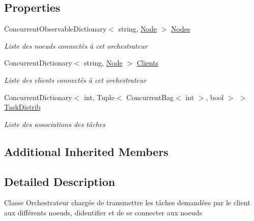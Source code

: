 \subsection*{Properties}
\begin{DoxyCompactItemize}
\item 
Concurrent\+Observable\+Dictionary$<$ string, \hyperlink{class_node_net_1_1_network_1_1_nodes_1_1_node}{Node} $>$ \hyperlink{class_node_net_1_1_network_1_1_orch_1_1_orchestrator_a8463f3979de7558db4c99d649bafe982}{Nodes}
\begin{DoxyCompactList}\small\item\em Liste des noeuds connectés à cet orchestrateur \end{DoxyCompactList}\item 
Concurrent\+Dictionary$<$ string, \hyperlink{class_node_net_1_1_network_1_1_nodes_1_1_node}{Node} $>$ \hyperlink{class_node_net_1_1_network_1_1_orch_1_1_orchestrator_a27d10cf18c1db44d6317065ac38470ef}{Clients}
\begin{DoxyCompactList}\small\item\em Liste des clients connectés à cet orchestrateur \end{DoxyCompactList}\item 
Concurrent\+Dictionary$<$ int, Tuple$<$ Concurrent\+Bag$<$ int $>$, bool $>$ $>$ \hyperlink{class_node_net_1_1_network_1_1_orch_1_1_orchestrator_a22f5c037662ffdf87f7ec1f0165606f7}{Task\+Distrib}
\begin{DoxyCompactList}\small\item\em Liste des associations des tâches \end{DoxyCompactList}\end{DoxyCompactItemize}
\subsection*{Additional Inherited Members}


\subsection{Detailed Description}
Classe Orchestrateur chargée de transmettre les tâches demandées par le client aux différents noeuds, d\textquotesingle{}identifier et de se connecter aux noeuds 



